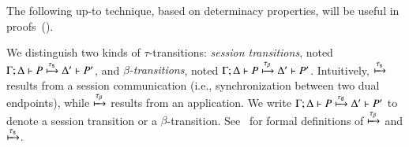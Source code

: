 \documentclass[preprint,11pt]{elsarticle}
\newtheorem{definition}{Definition}[section]
\begin{document}
{{%
%


The following up-to technique, based on determinacy properties, will be useful in proofs~().

 
 \begin{notation}
 \label{not:dettrans}
We distinguish two kinds of  $\tau$-transitions:
\emph{session transitions}, noted 
$\Gamma; \Delta \vdash P \xmapsto{\tau_{\mathsf{s}}} \Delta' \vdash P'$,
and 
\emph{$\beta$-transitions}, noted $\Gamma; \Delta \vdash P \xmapsto{\tau_{\beta}} \Delta' \vdash P'$.
Intuitively, $\xmapsto{\tau_{\mathsf{s}}}$  results from a session communication (i.e., synchronization between
two dual endpoints), while 
  $\xmapsto{\tau_{\beta}}$ results from an application. 
 We write  $\Gamma; \Delta \vdash P \xmapsto{\tau_{\mathsf{d}}} \Delta' \vdash P'$ to denote
	 a session transition or a $\beta$-transition.
	See~\cite{KouzapasPY17} for formal definitions of $\xmapsto{\tau_{\beta}}$  and $\xmapsto{\tau_{\mathsf{s}}}$. %
 \end{notation}
 
}}
\end{document}
